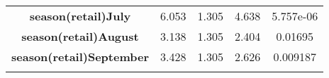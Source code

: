 \documentclass[]{book}
\theoremstyle{definition}
\theoremstyle{definition}
\theoremstyle{remark}
\begin{document}
\begin{longtable}[c]{@{}ccccc@{}}
\begin{minipage}[t]{0.35\columnwidth}\centering\strut
\textbf{season(retail)July}
\strut\end{minipage} &
\begin{minipage}[t]{0.13\columnwidth}\centering\strut
6.053
\strut\end{minipage} &
\begin{minipage}[t]{0.15\columnwidth}\centering\strut
1.305
\strut\end{minipage} &
\begin{minipage}[t]{0.12\columnwidth}\centering\strut
4.638
\strut\end{minipage} &
\begin{minipage}[t]{0.12\columnwidth}\centering\strut
5.757e-06
\strut\end{minipage}\tabularnewline
\begin{minipage}[t]{0.35\columnwidth}\centering\strut
\textbf{season(retail)August}
\strut\end{minipage} &
\begin{minipage}[t]{0.13\columnwidth}\centering\strut
3.138
\strut\end{minipage} &
\begin{minipage}[t]{0.15\columnwidth}\centering\strut
1.305
\strut\end{minipage} &
\begin{minipage}[t]{0.12\columnwidth}\centering\strut
2.404
\strut\end{minipage} &
\begin{minipage}[t]{0.12\columnwidth}\centering\strut
0.01695
\strut\end{minipage}\tabularnewline
\begin{minipage}[t]{0.35\columnwidth}\centering\strut
\textbf{season(retail)September}
\strut\end{minipage} &
\begin{minipage}[t]{0.13\columnwidth}\centering\strut
3.428
\strut\end{minipage} &
\begin{minipage}[t]{0.15\columnwidth}\centering\strut
1.305
\strut\end{minipage} &
\begin{minipage}[t]{0.12\columnwidth}\centering\strut
2.626
\strut\end{minipage} &
\begin{minipage}[t]{0.12\columnwidth}\centering\strut
0.009187
\strut\end{minipage}\tabularnewline
\begin{minipage}[t]{0.35\columnwidth}\centering\strut

\end{minipage}
\end{longtable}
\end{document}
